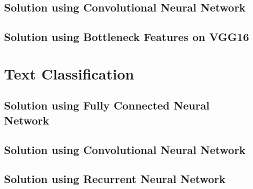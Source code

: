 \documentclass[10pt,twoside,a4paper,openany]{memoir}
\begin{document}
\section{Solution using Convolutional Neural Network}


%

\section{Solution using Bottleneck Features on VGG16}


%

\chapter{Text Classification}
\section{Solution using Fully Connected Neural Network}


\section{Solution using Convolutional Neural Network}


\section{Solution using Recurrent Neural Network}

\end{document}
